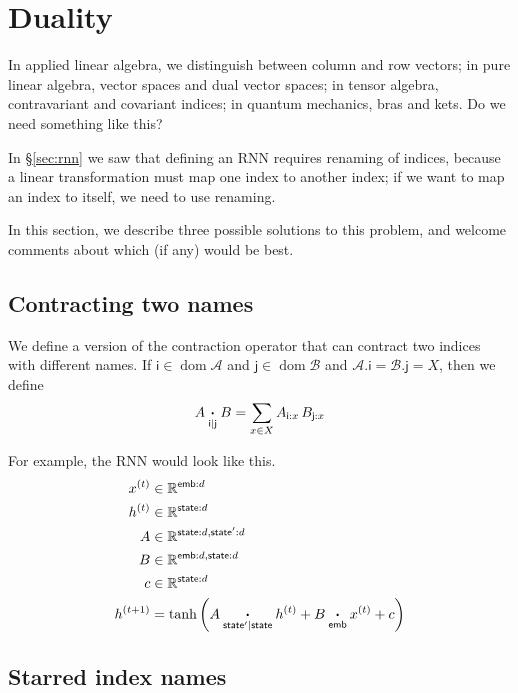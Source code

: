 \documentclass{article}
\newcommand{\name}[1]{\mathsf{#1}}
\newcommand{\ndot}[1]{\mathbin{\mathop{\thinspace\boldsymbol\cdot\thinspace}\displaylimits_{\name{#1}}}}
\newcommand{\nndot}[2]{\mathbin{\mathop{\thinspace\boldsymbol\cdot\thinspace}\displaylimits_{\name{#1}|\name{#2}}}}
\DeclareMathOperator{\tupledom}{dom}
\newcommand{\tupleproj}[2]{#1.#2}
\begin{document}
\section{Duality}
\label{sec:duality}

In applied linear algebra, we distinguish between column and row vectors; in pure linear algebra, vector spaces and dual vector spaces; in tensor algebra, contravariant and covariant indices; in quantum mechanics, bras and kets. Do we need something like this?

In \S\ref{sec:rnn} we saw that defining an RNN requires renaming of indices, because a linear transformation must map one index to another index; if we want to map an index to itself, we need to use renaming.

In this section, we describe three possible solutions to this problem, and welcome comments about which (if any) would be best.

\subsection{Contracting two names}

We define a version of the contraction operator that can contract two indices with different names. If $\name{i} \in \tupledom \mathcal{A}$ and $\name{j} \in \tupledom \mathcal{B}$ and $\tupleproj{\mathcal{A}}{\name{i}} = \tupleproj{\mathcal{B}}{\name{j}} = X$, then we define
\begin{equation*}
A \nndot{i}{j} B = \sum_{x \in X} A_{\name{i}: x} \, B_{\name{j}: x}
\end{equation*}

For example, the RNN would look like this.
\begin{align*}
x^{(t)} &\in \mathbb{R}^{\name{emb}: d} \\
h^{(t)} &\in \mathbb{R}^{\name{state}: d} \\
A &\in \mathbb{R}^{\name{state}: d, \name{state'}: d} \\
B &\in \mathbb{R}^{\name{emb}: d, \name{state}: d} \\
c &\in \mathbb{R}^{\name{state}: d} \\
h^{(t+1)} &= \tanh\left( A \nndot{state'}{state} h^{(t)} + B \ndot{emb} x^{(t)} + c \right)
\end{align*}

\subsection{Starred index names}
\end{document}
